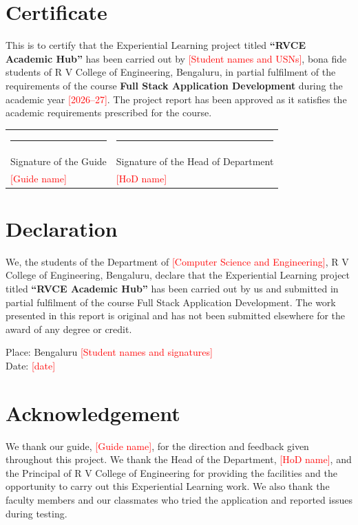 \documentclass[12pt,a4paper,oneside]{report}
\newcommand{\TODO}[1]{\textcolor{red}{[#1]}}
\newcommand{\appname}{RVCE Academic Hub}
\begin{document}

\chapter*{Certificate}
This is to certify that the Experiential Learning project titled \textbf{``\appname''} has been carried out by
\TODO{Student names and USNs}, bona fide students of R V College of Engineering, Bengaluru, in partial fulfilment
of the requirements of the course \textbf{Full Stack Application Development} during the academic year
\TODO{2026--27}. The project report has been approved as it satisfies the academic requirements prescribed for the course.

\vspace{3cm}
\noindent
\begin{tabularx}{\linewidth}{@{}X X@{}}
  \rule{5cm}{0.4pt} & \rule{5cm}{0.4pt} \\
  Signature of the Guide & Signature of the Head of Department \\
  \TODO{Guide name} & \TODO{HoD name} \\
\end{tabularx}

\chapter*{Declaration}
We, the students of the Department of \TODO{Computer Science and Engineering}, R V College of Engineering, Bengaluru,
declare that the Experiential Learning project titled \textbf{``\appname''} has been carried out by us and submitted
in partial fulfilment of the course Full Stack Application Development. The work presented in this report is original
and has not been submitted elsewhere for the award of any degree or credit.

\vspace{2cm}
\noindent Place: Bengaluru \hfill \TODO{Student names and signatures}\\
Date: \TODO{date}

\chapter*{Acknowledgement}
We thank our guide, \TODO{Guide name}, for the direction and feedback given throughout this project. We thank the
Head of the Department, \TODO{HoD name}, and the Principal of R V College of Engineering for providing the facilities
and the opportunity to carry out this Experiential Learning work. We also thank the faculty members and our classmates
who tried the application and reported issues during testing.
\end{document}
